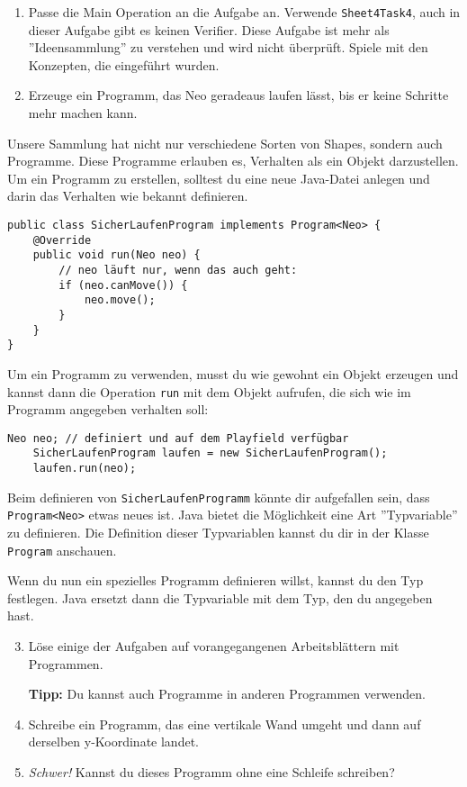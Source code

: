 
\begin{enumerate}
	\item Passe die Main Operation an die Aufgabe an.
		Verwende \lstinline{Sheet4Task4}, auch in dieser Aufgabe gibt es keinen Verifier.
		Diese Aufgabe ist mehr als ''Ideensammlung'' zu verstehen und wird nicht überprüft.
		Spiele mit den Konzepten, die eingeführt wurden.
	\item Erzeuge ein Programm, das Neo geradeaus laufen lässt, bis er keine Schritte mehr machen kann.
\end{enumerate}

\begin{Infobox}[Programme]
	Unsere Sammlung hat nicht nur verschiedene Sorten von Shapes, sondern auch Programme.
	Diese Programme erlauben es, Verhalten als ein Objekt darzustellen.
	Um ein Programm zu erstellen, solltest du eine neue Java-Datei anlegen und darin das Verhalten wie bekannt definieren.

	\begin{lstlisting}[title=SicherLaufenProgram.java, numbers=none,xleftmargin=0.5cm]
public class SicherLaufenProgram implements Program<Neo> {
	@Override
	public void run(Neo neo) {
		// neo läuft nur, wenn das auch geht:
		if (neo.canMove()) {
			neo.move();
		}
	}
}
	\end{lstlisting}

	Um ein Programm zu verwenden, musst du wie gewohnt ein Objekt erzeugen und kannst dann die Operation \lstinline{run} mit dem Objekt aufrufen, die sich wie im Programm angegeben verhalten soll:

	\begin{lstlisting}[numbers=none,xleftmargin=0.5cm]
	Neo neo; // definiert und auf dem Playfield verfügbar
	SicherLaufenProgram laufen = new SicherLaufenProgram();
	laufen.run(neo);
	\end{lstlisting}
\end{Infobox}

\begin{Infobox}
	Beim definieren von \lstinline{SicherLaufenProgramm} könnte dir aufgefallen sein, dass \mbox{\lstinline{Program<Neo>}} etwas neues ist.
	Java bietet die Möglichkeit eine Art ''Typvariable'' zu definieren.
	Die Definition dieser Typvariablen kannst du dir in der Klasse \lstinline{Program} anschauen.

	Wenn du nun ein spezielles Programm definieren willst, kannst du den Typ festlegen.
	Java ersetzt dann die Typvariable mit dem Typ, den du angegeben hast.
\end{Infobox}

\begin{enumerate}\setcounter{enumi}{2}
	\item Löse einige der Aufgaben auf vorangegangenen Arbeitsblättern mit Programmen.
	
	\textbf{Tipp:} Du kannst auch Programme in anderen Programmen verwenden.
	\item Schreibe ein Programm, das eine vertikale Wand umgeht und dann auf derselben y-Koordinate landet.
	\item \optional \emph{Schwer!} Kannst du dieses Programm ohne eine Schleife schreiben?
\end{enumerate}

